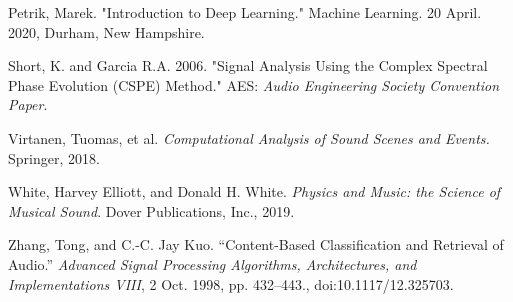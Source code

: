 \documentclass[12pt,letterpaper]{article}
\begin{document}
\begin{thebibliography}{9}
Petrik, Marek. "Introduction to Deep Learning." Machine Learning. 20 April. 2020, Durham, New Hampshire.

Short, K. and Garcia R.A. 2006. "Signal Analysis Using the Complex Spectral Phase Evolution (CSPE) Method." AES: \textit{Audio Engineering Society Convention Paper}.

Virtanen, Tuomas, et al. \textit{Computational Analysis of Sound Scenes and Events.} Springer, 2018.

White, Harvey Elliott, and Donald H. White. \textit{Physics and Music: the Science of Musical Sound}. Dover Publications, Inc., 2019.

Zhang, Tong, and C.-C. Jay Kuo. “Content-Based Classification and Retrieval of Audio.” \textit{Advanced Signal Processing Algorithms, Architectures, and Implementations VIII}, 2 Oct. 1998, pp. 432–443., doi:10.1117/12.325703.

\end{thebibliography}

\end{document}
